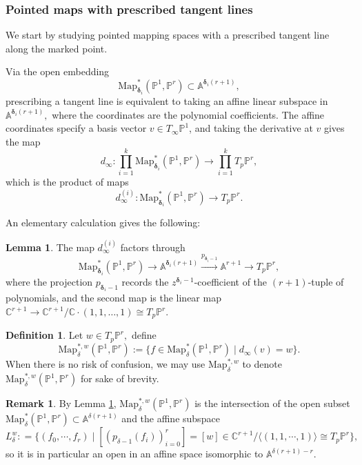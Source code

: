 \documentclass[12pt,reqno]{amsart}
\theoremstyle{definition}
\theoremstyle{definition}
\theoremstyle{definition}
\theoremstyle{definition}
\newtheorem{lemma}[theorem]{Lemma}
\newtheorem{remark}[theorem]{Remark}
\newtheorem{definition}[theorem]{Definition}
\begin{document}
\subsubsection{Pointed maps with prescribed tangent lines}\label{sec:prestan}
We start by studying pointed mapping spaces with a prescribed tangent line along the marked point. 

Via the open embedding $$\mathrm{Map}_{\boldsymbol{\delta}_i}^{*}(\mathbb{P}^1, \mathbb{P}^r)\subset \mathbb{A}^{\boldsymbol{\delta}_i(r+1)},$$ prescribing a tangent line is equivalent to taking an affine linear subspace in $\mathbb{A}^{\boldsymbol{\delta}_i(r+1)},$ where the coordinates are the polynomial coefficients. The affine coordinates specify a basis vector \(v\in T_\infty \mathbb{P}^1\), and taking the derivative at \(v\) gives the map $$d_\infty: \prod_{i=1}^k  \mathrm{Map}_{\boldsymbol{\delta}_i}^{*}(\mathbb{P}^1, \mathbb{P}^r)\to \prod_{i=1}^k T_p \mathbb{P}^r,$$ which is the product of maps $$d_\infty^{(i)}: \mathrm{Map}_{\boldsymbol{\delta}_i}^{*}(\mathbb{P}^1, \mathbb{P}^r)\to T_p \mathbb{P}^r.$$

An elementary calculation gives the following:

\begin{lemma}\cite[Lemma 4.1]{vzdualcomplex}\label{lem-derivative}
  The map \(d_\infty^{(i)}\) factors through \[\mathrm{Map}_{\boldsymbol{\delta}_i}^{*}(\mathbb{P}^1, \mathbb{P}^r)\to \mathbb{A}^{\boldsymbol{\delta}_i(r+1)}\xrightarrow{p_{\boldsymbol{\delta}_i-1}} \mathbb{A}^{r+1}\to T_p \mathbb{P}^r,\] where the projection \(p_{\boldsymbol{\delta}_i-1}\) records the \(z^{\boldsymbol{\delta}_i-1}\)-coefficient of the \((r+1)\)-tuple of polynomials, and the second map is the linear map \(\mathbb{C}^{r+1}\to \mathbb{C}^{r+1}/\mathbb{C}\cdot (1,1,\dots, 1)\cong T_p \mathbb{P}^r.\)
\end{lemma}

\begin{definition}
  Let \(w\in T_p \mathbb{P}^r,\) define \[\mathrm{Map}_{{\delta}}^{*, w}(\mathbb{P}^1, \mathbb{P}^r):=\{f\in \mathrm{Map}_{{\delta}}^{*}(\mathbb{P}^1, \mathbb{P}^r)\mid d_\infty(v) = w \}.\] When there is no risk of confusion, we may use $\mathrm{Map}_{{\delta}}^{*, w}$ to denote $\mathrm{Map}_{{\delta}}^{*, w}(\mathbb{P}^1, \mathbb{P}^r)$ for sake of brevity.
\end{definition}

\begin{remark}By Lemma \ref{lem-derivative}, \(\mathrm{Map}_{{\delta}}^{*, w}(\mathbb{P}^1, \mathbb{P}^r)\) is the intersection of the open subset $\mathrm{Map}_{{\delta}}^{*}(\mathbb{P}^1, \mathbb{P}^r)\subset \mathbb{A}^{\delta(r+1)}$ and the affine subspace $$L_{\delta}^{w}: = \{(f_0,\cdots, f_r)\mid \left[\left(p_{\delta-1}(f_i)\right)_{i=0}^r\right] = [w]\in \mathbb{C}^{r+1}/\langle(1,1,\cdots,1)\rangle\cong T_p \mathbb{P}^r\},$$ so it is in particular an open in an affine space isomorphic to $\mathbb{A}^{\delta(r+1)-r}.$\end{remark}
\end{document}
